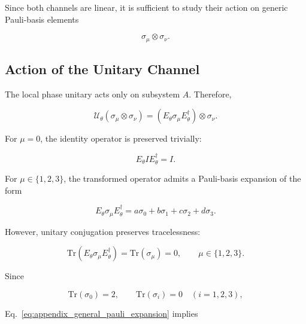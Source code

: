 Since both channels are linear, it is sufficient to study their action on generic Pauli-basis elements

\[
\sigma_{\mu}
\otimes
\sigma_{\nu}.
\]


\subsection*{Action of the Unitary Channel}

The local phase unitary acts only on subsystem \( A \). Therefore,

\begin{equation}
\mathcal{U}_{\theta}
\left(
\sigma_{\mu}\otimes\sigma_{\nu}
\right)
=
\left(
E_{\theta}\sigma_{\mu}E_{\theta}^{\dagger}
\right)
\otimes
\sigma_{\nu}.
\label{eq:appendix_unitary_pauli_action}
\end{equation}

\medskip

For \( \mu = 0 \), the identity operator is preserved trivially:

\begin{equation}
E_{\theta}IE_{\theta}^{\dagger}
=
I.
\end{equation}

\medskip

For \( \mu \in \{1,2,3\} \), the transformed operator admits a Pauli-basis expansion of the form

\begin{equation}
E_{\theta}\sigma_{\mu}E_{\theta}^{\dagger}
=
a\sigma_0
+
b\sigma_1
+
c\sigma_2
+
d\sigma_3.
\label{eq:appendix_general_pauli_expansion}
\end{equation}

\medskip

However, unitary conjugation preserves tracelessness:

\begin{equation}
\mathrm{Tr}
\left(
E_{\theta}\sigma_{\mu}E_{\theta}^{\dagger}
\right)
=
\mathrm{Tr}(\sigma_{\mu})
=
0,
\qquad
\mu\in\{1,2,3\}.
\label{eq:appendix_trace_preservation}
\end{equation}

Since

\[
\mathrm{Tr}(\sigma_0)=2,
\qquad
\mathrm{Tr}(\sigma_i)=0
\quad
(i=1,2,3),
\]

Eq.~\eqref{eq:appendix_general_pauli_expansion} implies

